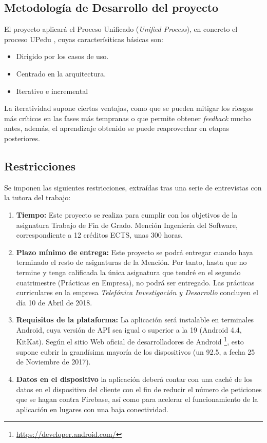 \documentclass[twoside]{report}
\begin{document}
\subsection{Metodología de Desarrollo del proyecto}
El proyecto aplicará el Proceso Unificado (\textit{Unified Process}), en concreto el proceso UPedu \cite{upedu}, cuyas caracterísiticas básicas \cite{pgpup} son: 
\begin{itemize}
\item Dirigido por los casos de uso.
\item Centrado en la arquitectura.
\item Iterativo e incremental
\end{itemize}
La iteratividad supone ciertas ventajas, como que se pueden mitigar los riesgos más críticos en las fases más tempranas o que permite obtener \textit{feedback} mucho antes, además, el aprendizaje obtenido se puede reaprovechar en etapas posteriores.

\subsection{Restricciones}
Se imponen las siguientes restricciones, extraídas tras una serie de entrevistas con la tutora del trabajo:

\begin{enumerate}
\item \textbf{Tiempo:} Este proyecto se realiza para cumplir con los objetivos de la asignatura Trabajo de Fin de Grado. Mención Ingeniería del Software, correspondiente a 12 créditos ECTS, unas 300 horas.

\item \textbf{Plazo mínimo de entrega:} Este proyecto se podrá entregar cuando haya terminado el resto de asignaturas de la Mención. Por tanto, hasta que no termine y tenga calificada la única asignatura que tendré en el segundo cuatrimestre (Prácticas en Empresa), no podrá ser entregado. Las prácticas curriculares en la empresa \textit{Telefónica Investigación y Desarrollo} concluyen el día 10 de Abril de 2018.

\item \textbf{Requisitos de la plataforma:} La aplicación será instalable en terminales Android, cuya versión de API sea igual o superior a la 19 (Android 4.4, KitKat). Según el sitio Web oficial de desarrolladores de Android \footnote{\url{https://developer.android.com/}}, esto supone cubrir la grandísima mayoría de los dispositivos (un 92.5, a fecha 25 de Noviembre de 2017)\cite{androidversiondist}.

\item \textbf{Datos en el dispositivo } la aplicación deberá contar con una caché de los datos en el dispositivo del cliente con el fin de reducir el número de peticiones que se hagan contra Firebase, así como para acelerar el funcionamiento de la aplicación en lugares con una baja conectividad.
\end{enumerate}
\end{document}
